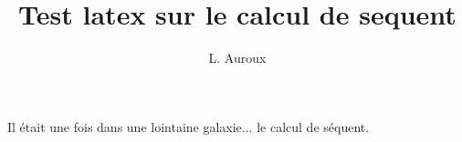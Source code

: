 \documentclass[a4paper]{article}
\title{Test latex sur le calcul de sequent}
\author{L. Auroux}
\begin{document}
    \maketitle
    \tableofcontents

    Il était une fois dans une lointaine galaxie...
    le calcul de séquent.
\end{document}
